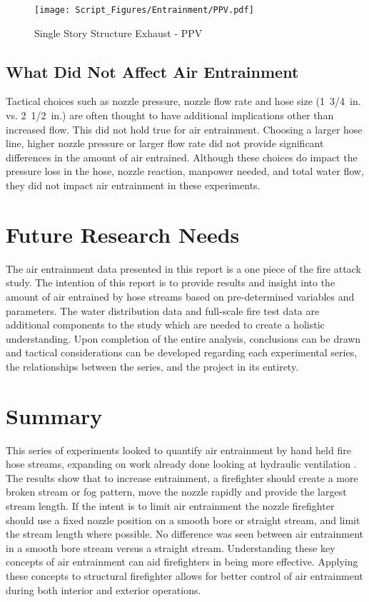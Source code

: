 \documentclass[12pt,oneside]{book}
\begin{document}
\begin{figure}[!ht]
\centering
\texttt{[image: Script\_Figures/Entrainment/PPV.pdf]}
\caption[Single Story Structure Exhaust - PPV]{Single Story Structure Exhaust - PPV \cite{Zevotek_Kerber:2016}}
\label{fig:PPV}
\end{figure}

\section{What Did Not Affect Air Entrainment}
Tactical choices such as nozzle pressure, nozzle flow rate and hose size (1~3/4~in. vs. 2~1/2~in.) are often thought to have additional implications other than increased flow. This did not hold true for air entrainment. Choosing a larger hose line, higher nozzle pressure or larger flow rate did not provide significant differences in the amount of air entrained. Although these choices do impact the pressure loss in the hose, nozzle reaction, manpower needed, and total water flow, they did not impact air entrainment in these experiments.

\chapter{Future Research Needs}

The air entrainment data presented in this report is a one piece of the fire attack study. The intention of this report is to provide results and insight into the amount of air entrained by hose streams based on pre-determined variables and parameters. The water distribution data and full-scale fire test data are additional components to the study which are needed to create a holistic understanding. Upon completion of the entire analysis, conclusions can be drawn and tactical considerations can be developed regarding each experimental series, the relationships between the series, and the project in its entirety.  

\chapter{Summary}

This series of experiments looked to quantify air entrainment by hand held fire hose streams, expanding on work already done looking at hydraulic ventilation \cite{KnappNozzles1,KnappNozzles2,KnappNozzles3,NISTHoseStreams}. The results show that to increase entrainment, a firefighter should create a more broken stream or fog pattern, move the nozzle rapidly and provide the largest stream length. If the intent is to limit air entrainment the nozzle firefighter should use a fixed nozzle position on a smooth bore or straight stream, and limit the stream length where possible.  No difference was seen between air entrainment in a smooth bore stream versus a straight stream. Understanding these key concepts of air entrainment can aid firefighters in being more effective. Applying these concepts to structural firefighter allows for better control of air entrainment during both interior and exterior operations. 
\end{document}
